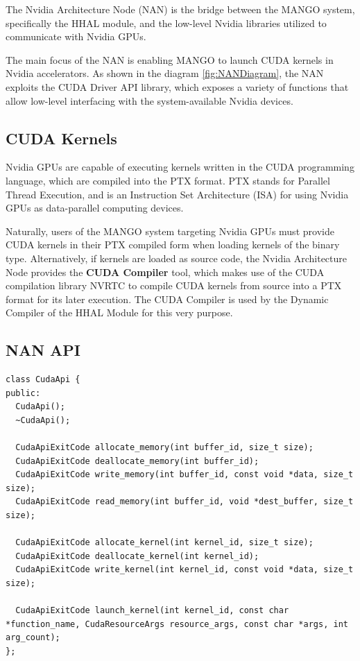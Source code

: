 The Nvidia Architecture Node (NAN) is the bridge between the MANGO system, specifically the HHAL module, and the low-level Nvidia libraries utilized to communicate with Nvidia GPUs.

The main focus of the NAN is enabling MANGO to launch CUDA kernels in Nvidia accelerators. As shown in the diagram \ref{fig:NANDiagram}, the NAN exploits the CUDA Driver API \cite{cuda_driver_api} library, which exposes a variety of functions that allow low-level interfacing with the system-available Nvidia devices.

\subsection{CUDA Kernels} \label{Nvidia:CudaCompiler}

Nvidia GPUs are capable of executing kernels written in the CUDA programming language, which are compiled into the PTX \cite{ptx} format. PTX stands for Parallel Thread Execution, and is an Instruction Set Architecture (ISA) for using Nvidia GPUs as data-parallel computing devices.

Naturally, users of the MANGO system targeting Nvidia GPUs must provide CUDA kernels in their PTX compiled form when loading kernels of the binary type.
Alternatively, if kernels are loaded as source code, the Nvidia Architecture Node provides the \textbf{CUDA Compiler} tool, which makes use of the CUDA compilation library NVRTC \cite{nvrtc} to compile CUDA kernels from source into a PTX format for its later execution. The CUDA Compiler is used by the Dynamic Compiler of the HHAL Module for this very purpose.

\subsection{NAN API}

\begin{lstlisting}[style=CStyle, label=NAN:CudaApi, caption=Nvidia Architecture Manager - CudaApi]
class CudaApi {
public:
  CudaApi();
  ~CudaApi();

  CudaApiExitCode allocate_memory(int buffer_id, size_t size);
  CudaApiExitCode deallocate_memory(int buffer_id);
  CudaApiExitCode write_memory(int buffer_id, const void *data, size_t size);
  CudaApiExitCode read_memory(int buffer_id, void *dest_buffer, size_t size);

  CudaApiExitCode allocate_kernel(int kernel_id, size_t size);
  CudaApiExitCode deallocate_kernel(int kernel_id);
  CudaApiExitCode write_kernel(int kernel_id, const void *data, size_t size);
  
  CudaApiExitCode launch_kernel(int kernel_id, const char *function_name, CudaResourceArgs resource_args, const char *args, int arg_count);
};
\end{lstlisting}

